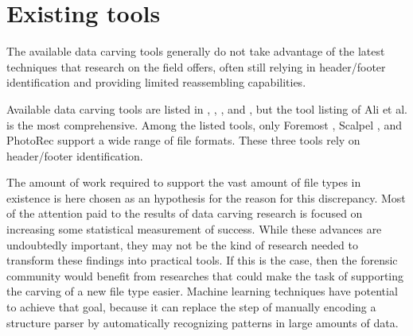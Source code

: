 \section{Existing tools}
The available data carving tools generally do not take advantage of the latest techniques that research on the field offers, often still relying in header/footer identification and providing limited reassembling capabilities.


Available data carving tools are listed in \cite{ali_review_2018}, \cite{qiu_new_2014}, \cite{nadeem_ashraf_forensic_2013}, and \cite{roux_reconstructing_2008}, but the tool listing of Ali et al. \cite{ali_review_2018} is the most comprehensive. Among the listed tools, only Foremost \cite{kendall_notitle_2010}, Scalpel \cite{richard_iii_scalpel:_2005}, and PhotoRec \cite{grenier_photorec_2011} support a wide range of file formats. These three tools rely on header/footer identification.

The amount of work required to support the vast amount of file types in existence is here chosen as an hypothesis for the reason for this discrepancy. Most of the attention paid to the results of data carving research is focused on increasing some statistical measurement of success. While these advances are undoubtedly important, they may not be the kind of research needed to transform these findings into practical tools. If this is the case, then the forensic community would benefit from researches that could make the task of supporting the carving of a new file type easier. Machine learning techniques have potential to achieve that goal, because it can replace the step of manually encoding a structure parser by automatically recognizing patterns in large amounts of data.
